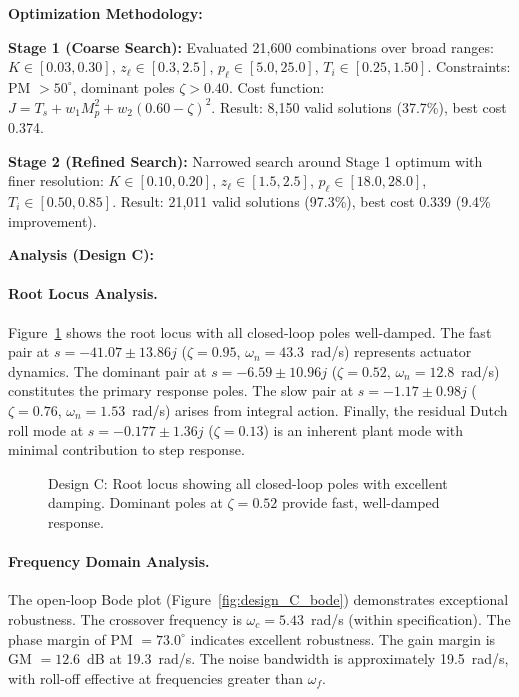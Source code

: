 \textbf{Optimization Methodology:}

\textbf{Stage 1 (Coarse Search):} Evaluated 21,600 combinations over broad ranges: $K \in [0.03,0.30]$, $z_\ell \in [0.3,2.5]$, $p_\ell \in [5.0,25.0]$, $T_i \in [0.25,1.50]$. Constraints: PM $>50^\circ$, dominant poles $\zeta > 0.40$. Cost function: $J = T_s + w_1 M_p^2 + w_2(0.60-\zeta)^2$. Result: 8,150 valid solutions (37.7\%), best cost 0.374.

\textbf{Stage 2 (Refined Search):} Narrowed search around Stage 1 optimum with finer resolution: $K \in [0.10,0.20]$, $z_\ell \in [1.5,2.5]$, $p_\ell \in [18.0,28.0]$, $T_i \in [0.50,0.85]$. Result: 21,011 valid solutions (97.3\%), best cost 0.339 (9.4\% improvement).

\textbf{Analysis (Design C):}

\paragraph{Root Locus Analysis.}
Figure~\ref{fig:design_C_rlocus} shows the root locus with all closed-loop poles well-damped. The fast pair at $s = -41.07 \pm 13.86j$ ($\zeta=0.95$, $\omega_n=43.3$~rad/s) represents actuator dynamics. The dominant pair at $s = -6.59 \pm 10.96j$ ($\zeta=0.52$, $\omega_n=12.8$~rad/s) constitutes the primary response poles. The slow pair at $s = -1.17 \pm 0.98j$ ($\zeta=0.76$, $\omega_n=1.53$~rad/s) arises from integral action. Finally, the residual Dutch roll mode at $s = -0.177 \pm 1.36j$ ($\zeta=0.13$) is an inherent plant mode with minimal contribution to step response.

\begin{figure}[h!]
\centering
\resizebox{0.7\textwidth}{!}{}
\caption{Design C: Root locus showing all closed-loop poles with excellent damping. Dominant poles at $\zeta=0.52$ provide fast, well-damped response.}
\label{fig:design_C_rlocus}
\end{figure}

\paragraph{Frequency Domain Analysis.}
The open-loop Bode plot (Figure~\ref{fig:design_C_bode}) demonstrates exceptional robustness. The crossover frequency is $\omega_c = 5.43$~rad/s (within specification). The phase margin of PM $= 73.0^\circ$ indicates excellent robustness. The gain margin is GM $= 12.6$~dB at 19.3~rad/s. The noise bandwidth is approximately 19.5~rad/s, with roll-off effective at frequencies greater than $\omega_f$.

